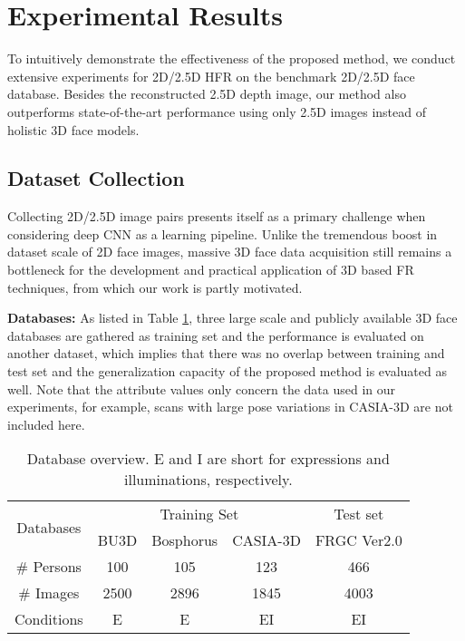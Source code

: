 \documentclass{bmvc2k}
\begin{document}
\section{Experimental Results}
To intuitively demonstrate the effectiveness of the proposed method, we conduct extensive experiments for 2D/2.5D HFR on the benchmark 2D/2.5D face database. Besides the reconstructed 2.5D depth image, our method also outperforms state-of-the-art performance using only 2.5D images instead of holistic 3D face models.

\subsection{Dataset Collection}
Collecting 2D/2.5D image pairs presents itself as a primary challenge when considering deep CNN as a learning pipeline. Unlike the tremendous boost in dataset scale of 2D face images, massive 3D face data acquisition still remains a bottleneck for the development and practical application of 3D based FR techniques, from which our work is partly motivated. 

\textbf{Databases:} As listed in Table \ref{database}, three large scale and publicly available 3D face databases are gathered as training set and the performance is evaluated on another dataset, which implies that there was no overlap between training and test set and the generalization capacity of the proposed method is evaluated as well. Note that the attribute values only concern the data used in our experiments, for example, scans with large pose variations in CASIA-3D are not included here. %

\begin{table}
\begin{center}
\begin{tabular}{ccccc}
\hline
\multirow{2}{*}{Databases} & \multicolumn{3}{c}{Training Set} & Test set \\ \cline{2-4}
& BU3D \cite{yin20063d} 
& Bosphorus \cite{savran2008bosphorus} 
& CASIA-3D \cite{CASIA-3D}
& FRGC Ver2.0 \cite{phillips2005overview}
\\
\hline
\# Persons  & 100  & 105  & 123  & 466 \\
\# Images   & 2500 & 2896 & 1845 & 4003 \\ 
Conditions  & E    & E    & EI   & EI \\          
\hline
\end{tabular}
\end{center}
\caption{Database overview. E and I are short for expressions and illuminations, respectively.}
\label{database}
\end{table}
\end{document}
